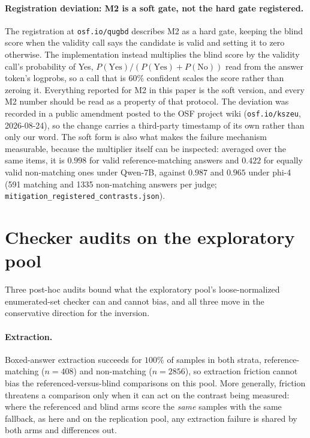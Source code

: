 \documentclass[11pt]{article}
\begin{document}
\paragraph{Registration deviation: M2 is a soft gate, not the hard gate registered.}
The registration at \texttt{osf.io/qugbd} describes M2 as a hard gate, keeping the blind score when the validity call says the candidate is valid and setting it to zero otherwise.
The implementation instead multiplies the blind score by the validity call's probability of Yes, $P(\text{Yes})/(P(\text{Yes}) + P(\text{No}))$ read from the answer token's logprobs, so a call that is 60\% confident scales the score rather than zeroing it.
Everything reported for M2 in this paper is the soft version, and every M2 number should be read as a property of that protocol.
The deviation was recorded in a public amendment posted to the OSF project wiki (\texttt{osf.io/kszeu}, 2026-08-24), so the change carries a third-party timestamp of its own rather than only our word.
The soft form is also what makes the failure mechanism measurable, because the multiplier itself can be inspected: averaged over the same items, it is $0.998$ for valid reference-matching answers and $0.422$ for equally valid non-matching ones under Qwen-7B, against $0.987$ and $0.965$ under phi-4 (591 matching and 1335 non-matching answers per judge; \texttt{mitigation\_registered\_contrasts.json}).

\section{Checker audits on the exploratory pool}
\label{app:audits}

Three post-hoc audits bound what the exploratory pool's loose-normalized enumerated-set checker can and cannot bias, and all three move in the conservative direction for the inversion.

\paragraph{Extraction.}
Boxed-answer extraction succeeds for $100\%$ of samples in both strata, reference-matching ($n{=}408$) and non-matching ($n{=}2856$), so extraction friction cannot bias the referenced-versus-blind comparisons on this pool.
More generally, friction threatens a comparison only when it can act on the contrast being measured: where the referenced and blind arms score the \emph{same} samples with the same fallback, as here and on the replication pool, any extraction failure is shared by both arms and differences out.
\end{document}
